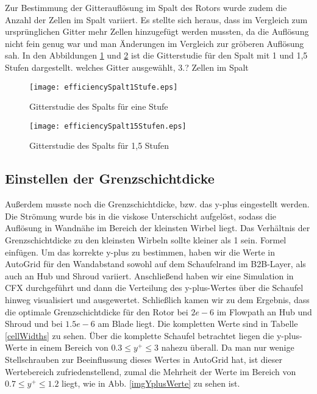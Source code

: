 Zur Bestimmung der Gitterauflösung im Spalt des Rotors wurde zudem die Anzahl der Zellen im Spalt variiert. Es stellte sich heraus, dass im Vergleich zum ursprünglichen Gitter mehr Zellen hinzugefügt werden mussten, da die Auflösung nicht fein genug war und man Änderungen im Vergleich zur gröberen Auflösung sah.  In den Abbildungen \ref{effSpalt1} und \ref{effSpalt15} ist die Gitterstudie für den Spalt mit 1 und 1,5 Stufen dargestellt. \todo welches Gitter ausgewählt, 3.? \todo Zellen im Spalt


\begin{figure}[htbp]
	\centering
	\label{effSpalt1}
	\texttt{[image: efficiencySpalt1Stufe.eps]}
	\caption{Gitterstudie des Spalts für eine Stufe}
\end{figure}

\begin{figure}[htbp]
	\centering
	\label{effSpalt15}
	\texttt{[image: efficiencySpalt15Stufen.eps]}
	\caption{Gitterstudie des Spalts für 1,5 Stufen}
\end{figure}

\subsection{Einstellen der Grenzschichtdicke}
Außerdem musste noch die Grenzschichtdicke, bzw. das y-plus eingestellt werden. Die Strömung wurde bis in die viskose Unterschicht aufgelöst, sodass die Auflösung in Wandnähe im Bereich der kleinsten Wirbel liegt. Das Verhältnis der Grenzschichtdicke zu den kleinsten Wirbeln sollte kleiner als 1 sein. \todo Formel einfügen. Um das korrekte y-plus zu bestimmen, haben wir die Werte in AutoGrid für den Wandabstand sowohl auf dem Schaufelrand im B2B-Layer, als auch an Hub und Shroud variiert.  Anschließend haben wir eine Simulation in CFX durchgeführt und dann die Verteilung des y-plus-Wertes über die Schaufel hinweg visualisiert und ausgewertet. Schließlich kamen wir zu dem Ergebnis, dass die optimale Grenzschichtdicke für den Rotor bei $2e-6$ im Flowpath an Hub und Shroud und bei $1.5e-6$ am Blade liegt. Die kompletten Werte sind in Tabelle \ref{cellWidths} zu sehen. Über die komplette Schaufel betrachtet liegen die y-plus-Werte in einem Bereich von $0.3 \leq y^+ \leq 3$ nahezu überall. Da man nur wenige Stellschrauben zur Beeinflussung dieses Wertes in AutoGrid hat, ist dieser Wertebereich zufriedenstellend, zumal die Mehrheit der Werte im Bereich von $0.7 \leq y^+ \leq 1.2$  liegt, wie in Abb. \ref{imgYplusWerte} zu sehen ist. 

